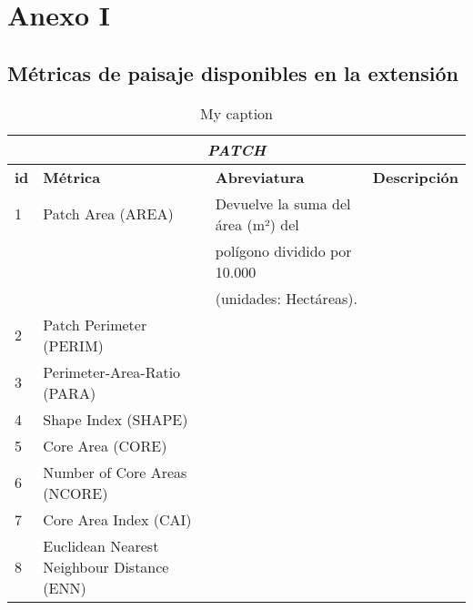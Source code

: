 \chapter{Anexo I}\label{anexoI}

\section*{Métricas de paisaje disponibles en la extensión}

\begin{landscape}
\begin{table}[]
\centering
\caption{My caption}
\label{my-label}
\begin{tabular}{lllll}
\hline
\multicolumn{5}{c}{\textit{\textbf{PATCH}}}                                                                                              \\ \hline
\textbf{id} & \textbf{Métrica}                           & \textbf{Abreviatura}               & \multicolumn{2}{l}{\textbf{Descripción}} \\ \hline
1           & Patch Area (AREA)                          & Devuelve la suma del área (m²) del &                     &                    \\
            &                                            & polígono dividido por 10.000       &                     &                    \\
            &                                            & (unidades: Hectáreas).             &                     &                    \\
2           & Patch Perimeter (PERIM)                    &                                    &                     &                    \\
3           & Perimeter-Area-Ratio (PARA)                &                                    &                     &                    \\
4           & Shape Index (SHAPE)                        &                                    &                     &                    \\
5           & Core Area (CORE)                           &                                    &                     &                    \\
6           & Number of Core Areas (NCORE)               &                                    &                     &                    \\
7           & Core Area Index (CAI)                      &                                    &                     &                    \\
8           & Euclidean Nearest Neighbour Distance (ENN) &                                    &                     &                    \\ \hline
\end{tabular}
\end{table}
\end{landscape}